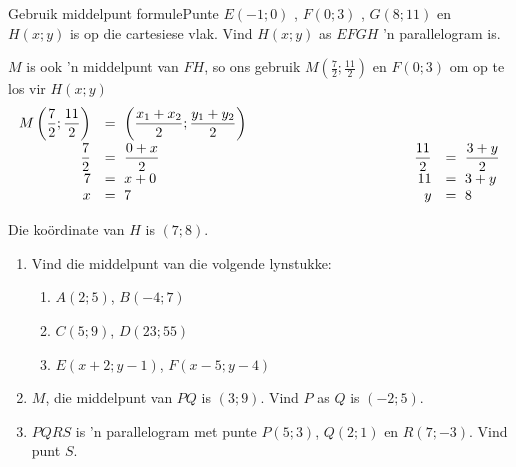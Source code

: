 \begin{wex}{Gebruik middelpunt formule}{Punte $E(-1;0)$ , $F(0;3)$ , $G(8;11)$ en $H(x;y)$ is op die cartesiese vlak. Vind $H(x;y)$ as $EFGH$ 'n parallelogram is.}
{
$M$ is ook 'n middelpunt van $FH$, so ons gebruik $M(\frac{7}{2};\frac{11}{2})$ en $F(0;3)$ om op te los vir $H(x;y)$
\begin{equation*}
\begin{array}{rllrl}
 M\left(\dfrac{7}{2};\dfrac{11}{2}\right) &=~\left(\dfrac{x_1+x_2}{2}; \dfrac{y_1+y_2}{2}\right)\\[8pt]
\dfrac{7}{2}&=~\dfrac{0+x}{2}&\hskip10em&\dfrac{11}{2}&=~\dfrac{3+y}{2}\\
7&=~x+0&&11&=~3+y\\
x&=~7&&y&=~8\\
\end{array}
\end{equation*}

Die ko\"ordinate van $H$ is $(7;8)$.
}
\end{wex}
\begin{exercises}{}
\begin{enumerate}[itemsep=5pt, label=\textbf{\arabic*}. ]
\item Vind die middelpunt van die volgende lynstukke:
  \begin{enumerate}[noitemsep, label=\textbf{(\alph*)} ]
\item $A(2;5)$, $B(-4;7)$
\item $C(5;9)$, $D(23;55)$
\item $E(x+2;y-1)$, $F(x-5;y-4)$
\end{enumerate}

\item $M$, die middelpunt van $PQ$ is $(3;9)$. Vind $P$ as $Q$ is $(-2;5)$.
\item $PQRS$ is 'n parallelogram met punte $P(5;3)$, $Q(2;1)$ en $R(7;-3)$. Vind punt $S$.

\end{enumerate}
\end{exercises}    

